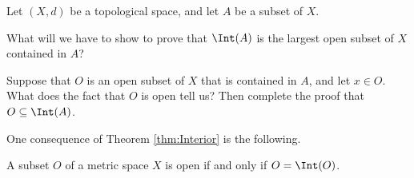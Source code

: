 \begin{activity} Let $(X,d)$ be a topological space, and let $A$ be a subset of $X$. 
\ba
\item What will we have to show to prove that $\Int(A)$ is the largest open subset of $X$ contained in $A$?

\item Suppose that $O$ is an open subset of $X$ that is contained in $A$, and let $x \in O$. What does the fact that $O$ is open tell us? Then complete the proof that $O \subseteq \Int(A)$.

\ea

\end{activity}

\begin{comment}

\ActivitySolution

\ba
\item To prove that $\Int(A)$ is the largest open subset of $X$ contained in $A$ we need to prove that any open subset of $X$ that is contained in $A$ is a subset of $\Int(A)$.

\item Suppose that $O$ is an open subset of $X$ that is contained in $A$, and let $x \in O$. Since $O$ is a neighborhood of $x$, it follows that $A$ is a neighborhood of $x$ and $x \in \Int(A)$. It follows that $O \subseteq \Int(A)$ and $\Int(A)$ is the largest open subset of $X$ contained in $A$. 

\ea

\end{comment}

One consequence of Theorem \ref{thm:Interior} is the following.

\begin{corollary} A subset $O$ of a metric space $X$ is open if and only if $O = \Int(O)$. 
\end{corollary}
 